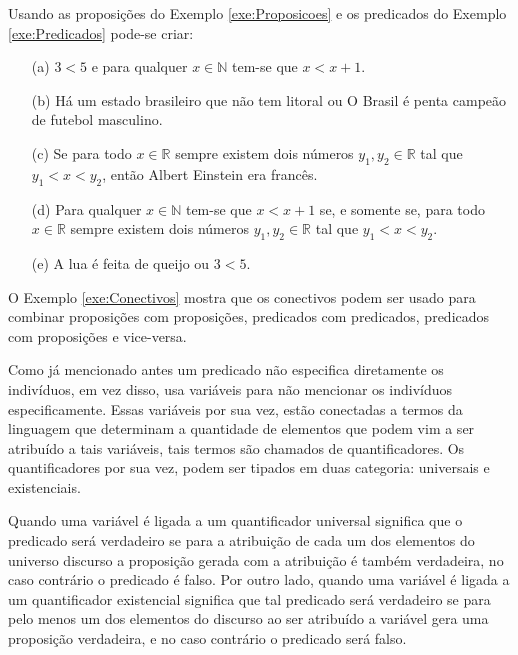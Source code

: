\begin{example}\label{exe:Conectivos}
	Usando as proposições do Exemplo \ref{exe:Proposicoes} e os predicados do Exemplo \ref{exe:Predicados} pode-se criar:
	\begin{itemize}
		\item[(a)] $3 < 5$ e para qualquer $x \in\mathbb{N}$ tem-se que $x < x + 1$.
		\item[(b)] Há um estado brasileiro que não tem litoral ou O Brasil é penta campeão de futebol masculino.
		\item[(c)] Se para todo $x \in \mathbb{R}$ sempre existem dois números $y_1, y_2 \in \mathbb{R}$ tal que $y_1 < x < y_2$, então Albert Einstein era francês.
		\item[(d)] Para qualquer $x \in\mathbb{N}$ tem-se que $x < x + 1$ se, e somente se, para todo $x \in \mathbb{R}$ sempre existem dois números $y_1, y_2 \in \mathbb{R}$ tal que $y_1 < x < y_2$.
		\item[(e)] A lua é feita de queijo ou $3 < 5$.
	\end{itemize}
\end{example}

\begin{remark}
    O Exemplo \ref{exe:Conectivos} mostra que os conectivos podem ser usado para combinar proposições com proposições, predicados com predicados, predicados com proposições e vice-versa.
\end{remark}

Como já mencionado antes um predicado não especifica diretamente os indivíduos, em vez disso, usa variáveis para não mencionar os indivíduos especificamente. Essas variáveis por sua vez, estão conectadas a termos da linguagem que determinam a quantidade de elementos que podem vim a ser atribuído a tais variáveis, tais termos são chamados de quantificadores. Os quantificadores por sua vez, podem ser tipados em duas categoria: universais e existenciais. 

Quando uma variável é ligada a um quantificador universal significa que o predicado será verdadeiro se para a atribuição de cada um  dos elementos do universo discurso a proposição gerada com a atribuição é também verdadeira, no caso contrário o predicado é falso. Por outro lado, quando uma variável é ligada a um quantificador existencial significa que tal predicado será verdadeiro se para pelo menos um dos elementos do discurso ao ser atribuído a variável gera uma proposição verdadeira, e no caso contrário o predicado será falso.


